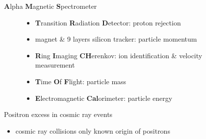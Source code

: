 \documentclass[11pt,a4paper,titlepage]{beamer}
\begin{document}
\begin{frame}{\textbf{A}lpha \textbf{M}agnetic \textbf{S}pectrometer}
\begin{figure}
\begin{minipage}{0.5\textwidth}
\end{minipage}
\begin{minipage}{0.48\textwidth}
\begin{itemize}
\item \textbf{T}ransition \textbf{R}adiation \textbf{D}etector: proton rejection\medskip
\item magnet \& 9 layers silicon tracker: particle momentum\medskip
\item \textbf{R}ing \textbf{I}maging \textbf{CH}erenkov: ion identification \& velocity measurement\medskip
\item \textbf{T}ime \textbf{O}f \textbf{F}light: particle mass\medskip
\item \textbf{E}lectromagnetic \textbf{Cal}orimeter: particle energy
\end{itemize}
\end{minipage}
\end{figure}
\end{frame}
\renewcommand\footnoterule{}
\begin{frame}[plain]
\end{frame}
\renewcommand{\footnoterule}{%
  \kern -3pt
  \hrule width \textwidth
  \kern 2pt
}
\begin{frame}{Positron excess in cosmic ray events}
\begin{minipage}{\textwidth}
\end{minipage}\vfill
\begin{minipage}{\textwidth}
\begin{itemize}
\item cosmic ray collisions only known origin of positrons
\end{itemize}
\end{minipage}
\end{frame}
\end{document}
